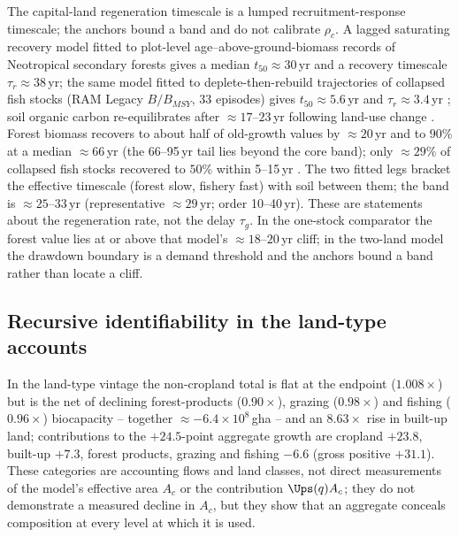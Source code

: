 The capital-land regeneration timescale is a lumped recruitment-response timescale; the anchors bound a band and do not calibrate $\rho_c$. A lagged saturating recovery model fitted to plot-level age--above-ground-biomass records of Neotropical secondary forests \citep[2ndFOR;][1{,}334 plots, 41 chronosequences, 35 good fits]{Poorter2016} gives a median $t_{50}\approx30$\,yr and a recovery timescale $\tau_r\approx38$\,yr; the same model fitted to deplete-then-rebuild trajectories of collapsed fish stocks (RAM Legacy $B/B_{MSY}$, 33 episodes) gives $t_{50}\approx5.6$\,yr and $\tau_r\approx3.4$\,yr \citep[cf.][]{HutchingsReynolds2004,Neubauer2013}; soil organic carbon re-equilibrates after $\approx17$--$23$\,yr following land-use change \citep{Poeplau2011}. Forest biomass recovers to about half of old-growth values by $\approx20$\,yr and to $90\%$ at a median $\approx66$\,yr \citep{Poorter2016} (the 66--95\,yr tail lies beyond the core band); only $\approx29\%$ of collapsed fish stocks recovered to $50\%$ within 5--15\,yr \citep{HutchingsReynolds2004}. The two fitted legs bracket the effective timescale (forest slow, fishery fast) with soil between them; the band is $\approx25$--$33$\,yr (representative $\approx29$\,yr; order 10--40\,yr). These are statements about the regeneration rate, not the delay $\tau_g$. In the one-stock comparator the forest value lies at or above that model's $\approx18$--$20$\,yr cliff; in the two-land model the drawdown boundary is a demand threshold and the anchors bound a band rather than locate a cliff.

\subsection{Recursive identifiability in the land-type accounts}\label{si:recursive}

In the land-type vintage the non-cropland total is flat at the endpoint ($1.008\times$) but is the net of declining forest-products ($0.90\times$), grazing ($0.98\times$) and fishing ($0.96\times$) biocapacity -- together $\approx-6.4\times10^{8}$\,gha -- and an $8.63\times$ rise in built-up land; contributions to the $+24.5$-point aggregate growth are cropland $+23.8$, built-up $+7.3$, forest products, grazing and fishing $-6.6$ (gross positive $+31.1$). These categories are accounting flows and land classes, not direct measurements of the model's effective area $A_c$ or the contribution $\Ups(q)A_c$; they do not demonstrate a measured decline in $A_c$, but they show that an aggregate conceals composition at every level at which it is used.

